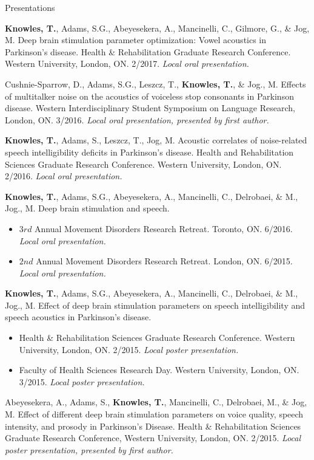 \documentclass{resume} %
\begin{document}
\begin{rSection}{Presentations}
	
	{\bf Knowles, T.}, Adams, S.G., Abeyesekera, A., Mancinelli, C., Gilmore, G., \& Jog, M. Deep brain stimulation parameter optimization: Vowel acoustics in Parkinson's disease. Health \& Rehabilitation Graduate Research Conference. Western University, London, ON. 2/2017. \emph{Local oral presentation.}

	Cushnie-Sparrow, D., Adams, S.G., Leszcz, T., {\bf Knowles, T.},  \& Jog., M. Effects of multitalker noise on the acoustics of voiceless stop consonants in Parkinson disease. Western Interdisciplinary Student Symposium on Language Research, London, ON. 3/2016. \emph{Local oral presentation, presented by first author.}

	{\bf Knowles, T.}, Adams, S., Leszcz, T., Jog, M. Acoustic correlates of noise-related speech intelligibility deficits in Parkinson's disease. Health and Rehabilitation Sciences Graduate Research Conference. Western University, London, ON. 2/2016. \emph{Local oral presentation.}
	
	{\bf Knowles, T.}, Adams, S.G., Abeyesekera, A., Mancinelli, C., Delrobaei, \& M., Jog., M. Deep brain stimulation and speech.
	\begin{itemize}
				\renewcommand\labelitemi{$\cdot$}
		\item $3rd$ Annual Movement Disorders Research Retreat. Toronto, ON. 6/2016.  \emph{Local oral presentation.}
		\item $2nd$ Annual Movement Disorders Research Retreat. London, ON. 6/2015.  \emph{Local oral presentation.}
	\end{itemize}
	
	{\bf Knowles, T.}, Adams, S.G., Abeyesekera, A., Mancinelli, C., Delrobaei, \& M., Jog., M. Effect of deep brain stimulation parameters on speech intelligibility and speech acoustics in Parkinson's disease. 
	\begin{itemize}
				\renewcommand\labelitemi{$\cdot$}
		\item Health \& Rehabilitation Sciences Graduate Research Conference. Western University, London, ON.  2/2015.  \emph{Local poster presentation.}
		\item Faculty of Health Sciences Research Day. Western University, London, ON. 3/2015.  \emph{Local poster presentation.}
	\end{itemize}
	
	Abeyesekera, A., Adams, S., {\bf Knowles, T.}, Mancinelli, C., Delrobaei, M., \& Jog, M. Effect of different deep brain stimulation parameters on voice quality, speech intensity, and prosody in Parkinson's Disease. Health \& Rehabilitation Sciences Graduate Research Conference, Western University, London, ON. 2/2015.  \emph{Local poster presentation, presented by first author.}
	

\end{rSection}
\end{document}
